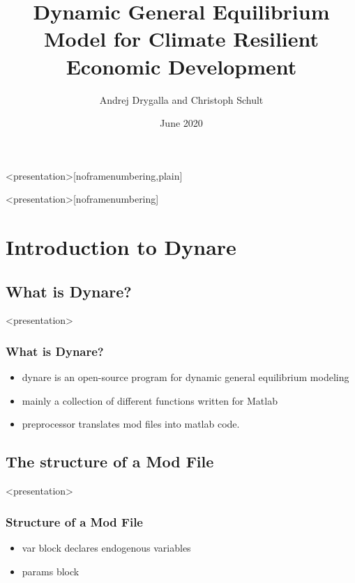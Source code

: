\documentclass[11pt,aspectratio=169]{beamer}
\title[DGE-CRED]{Dynamic General Equilibrium Model for Climate Resilient Economic Development}
\author[Christoph Schult]{Andrej Drygalla and Christoph Schult} \date[June 2020]{June 2020}
\institute[IWH]{Halle Institute for Economic Research}
\begin{document}
{}
\begin{frame}<presentation>[noframenumbering,plain]
  \titlepage
\end{frame}
\usebackgroundtemplate{
}
\begin{frame}<presentation>[noframenumbering]
  \tableofcontents[sectionstyle=show/show, subsectionstyle=show/show/hide]
\end{frame}

\section{Introduction to Dynare}
\subsection{What is Dynare?}
\begin{frame}<presentation>
\frametitle{What is Dynare?}
  \begin{itemize}
		\item dynare is an open-source program for dynamic general equilibrium modeling
		\item mainly a collection of different functions written for Matlab
		\item preprocessor translates mod files into matlab code.
	\end{itemize}
\end{frame}


\subsection{The structure of a Mod File}
\begin{frame}<presentation>
\frametitle{Structure of a Mod File}
  \begin{itemize}
		\item var block declares endogenous variables 
		\item params block
	\end{itemize}
\end{frame}
\end{document}
